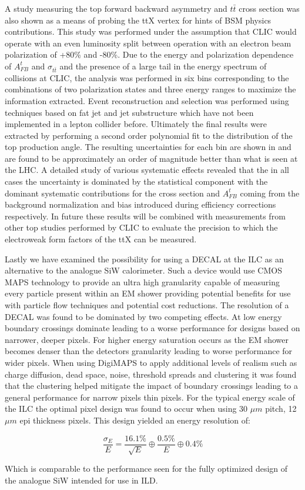 A study measuring the top forward backward asymmetry and $t\bar{t}$ cross section was also shown as a means of probing the ttX vertex for hints of \ac{BSM} physics contributions. This study was performed under the assumption that \ac{CLIC} would operate with an even luminosity split between operation with an electron beam polarization of +80\% and -80\%. Due to the energy and polarization dependence of $A_{FB}^t$ and $\sigma_{t\bar{t}}$ and the presence of a large tail in the energy spectrum of collisions at \ac{CLIC}, the analysis was performed in six bins corresponding to the combinations of two polarization states and three energy ranges to maximize the information extracted. Event reconstruction and selection was performed using techniques based on fat jet and jet substructure which have not been implemented in a lepton collider before. Ultimately the final results were extracted by performing a second order polynomial fit to the distribution of the top production angle. The resulting uncertainties for each bin are shown in  and are found to be approximately an order of magnitude better than what is seen at the \ac{LHC}\cite{Bai:2011uk}. A detailed study of various systematic effects revealed that the in all cases the uncertainty is dominated by the statistical component with the dominant systematic contributions for the cross section and $A_{FB}^t$ coming from the background normalization and bias introduced during efficiency corrections respectively. In future these results will be combined with measurements from other top studies performed by \ac{CLIC} to evaluate the precision to which the electroweak form factors of the ttX can be measured.

Lastly we have examined the possibility for using a \ac{DECAL} at the \ac{ILC} as an alternative to the analogue SiW calorimeter. Such a device would use \ac{CMOS} \ac{MAPS} technology to provide an ultra high granularity capable of measuring every particle present within an \ac{EM} shower providing potential benefits for use with particle flow techniques and potential cost reductions. The resolution of a \ac{DECAL} was found to be dominated by two competing effects. At low energy boundary crossings dominate leading to a worse performance for designs based on narrower, deeper pixels. For higher energy saturation occurs as the EM shower becomes denser than the detectors granularity leading to worse performance for wider pixels. When using DigiMAPS to apply additional levels of realism such as charge diffusion, dead space, noise, threshold spreads and clustering it was found that the clustering helped mitigate the impact of boundary crossings leading to a general performance for narrow pixels thin pixels. For the typical energy scale of the \ac{ILC} the optimal pixel design was found to occur when using 30 $\mu m$ pitch, 12 $\mu m$ epi thickness pixels. This design yielded an energy resolution of:

\begin{equation}
  \frac{\sigma_E}{E}=\frac{16.1\%}{\sqrt{E}} \oplus \frac{0.5\%}{E} \oplus 0.4\%
\end{equation}

Which is comparable to the performance seen for the fully optimized design of the analogue SiW intended for use in \ac{ILD}. 


